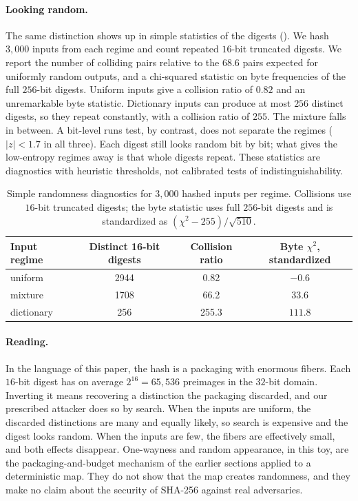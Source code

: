 \paragraph{Looking random.} The same distinction shows up in simple statistics of the digests (). We hash $3{,}000$ inputs from each regime and count repeated $16$-bit truncated digests. We report the number of colliding pairs relative to the $68.6$ pairs expected for uniformly random outputs, and a chi-squared statistic on byte frequencies of the full $256$-bit digests. Uniform inputs give a collision ratio of $0.82$ and an unremarkable byte statistic. Dictionary inputs can produce at most $256$ distinct digests, so they repeat constantly, with a collision ratio of $255$. The mixture falls in between. A bit-level runs test, by contrast, does not separate the regimes ($|z|<1.7$ in all three). Each digest still looks random bit by bit; what gives the low-entropy regimes away is that whole digests repeat. These statistics are diagnostics with heuristic thresholds, not calibrated tests of indistinguishability.

\begin{table}[tbp]
\centering
\caption{Simple randomness diagnostics for $3{,}000$ hashed inputs per regime. Collisions use $16$-bit truncated digests; the byte statistic uses full $256$-bit digests and is standardized as $(\chi^2-255)/\sqrt{510}$.}
\label{tab:hash-tests}
\small
\begin{tabular}{@{}lccc@{}}
\toprule
Input regime & Distinct 16-bit digests & Collision ratio & Byte $\chi^2$, standardized \\
\midrule
uniform & 2944 & 0.82 & $-0.6$ \\
mixture & 1708 & 66.2 & $33.6$ \\
dictionary & 256 & 255.3 & $111.8$ \\
\bottomrule
\end{tabular}
\end{table}

\paragraph{Reading.} In the language of this paper, the hash is a packaging with enormous fibers. Each $16$-bit digest has on average $2^{16}=65{,}536$ preimages in the $32$-bit domain. Inverting it means recovering a distinction the packaging discarded, and our prescribed attacker does so by search. When the inputs are uniform, the discarded distinctions are many and equally likely, so search is expensive and the digest looks random. When the inputs are few, the fibers are effectively small, and both effects disappear. One-wayness and random appearance, in this toy, are the packaging-and-budget mechanism of the earlier sections applied to a deterministic map. They do not show that the map creates randomness, and they make no claim about the security of SHA-256 against real adversaries.
